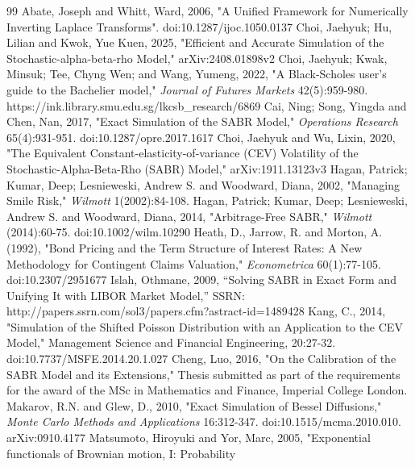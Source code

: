\documentclass[12pt,oneside]{article}
\numberwithin{equation}{section}
\begin{document}
\bigskip
\begin{thebibliography}{99}
        Abate, Joseph and Whitt, Ward, 2006, "A Unified Framework for Numerically Inverting Laplace Transforms".
        doi:10.1287/ijoc.1050.0137
        Choi, Jaehyuk; Hu, Lilian and Kwok, Yue Kuen, 2025, "Efficient and Accurate Simulation of the Stochastic-alpha-beta-rho Model,"
        arXiv:2408.01898v2
        Choi, Jaehyuk; Kwak, Minsuk; Tee, Chyng Wen; and Wang, Yumeng, 2022, "A Black-Scholes user's guide to the
        Bachelier model," {\em Journal of Futures Markets} 42(5):959-980. https://ink.library.smu.edu.sg/lkcsb\_research/6869
        Cai, Ning; Song, Yingda and Chen, Nan, 2017, "Exact Simulation of the SABR Model,"
        {\em Operations Research} 65(4):931-951. doi:10.1287/opre.2017.1617
        Choi, Jaehyuk and Wu, Lixin, 2020, "The Equivalent Constant-elasticity-of-variance (CEV) Volatility
        of the Stochastic-Alpha-Beta-Rho (SABR) Model,"
        arXiv:1911.13123v3
        Hagan, Patrick; Kumar, Deep; Lesnieweski, Andrew S. and Woodward, Diana, 2002,
        "Managing Smile Risk," {\em Wilmott} 1(2002):84-108.
        Hagan, Patrick; Kumar, Deep; Lesnieweski, Andrew S. and Woodward, Diana, 2014,
        "Arbitrage-Free SABR," {\em Wilmott} (2014):60-75. doi:10.1002/wilm.10290
        Heath, D., Jarrow, R. and Morton, A. (1992), "Bond Pricing and the Term Structure of Interest Rates:
        A New Methodology for Contingent Claims Valuation," {\em Econometrica} 60(1):77-105.
        doi:10.2307/2951677
        Islah, Othmane, 2009, “Solving SABR in Exact Form and Unifying It with LIBOR Market Model,”
        SSRN: http://papers.ssrn.com/sol3/papers.cfm?astract-id=1489428
        Kang, C., 2014, "Simulation of the Shifted Poisson Distribution with an Application
        to the CEV Model," {Management Science and Financial Engineering}, 20:27-32.
        doi:10.7737/MSFE.2014.20.1.027
        Cheng, Luo, 2016, "On the Calibration of the SABR Model and its
        Extensions," Thesis submitted as part of the requirements for the award
        of the MSc in Mathematics and Finance, Imperial College London. 
        Makarov, R.N. and Glew, D., 2010, "Exact Simulation of Bessel Diffusions,"
        {\em Monte Carlo Methods and Applications} 16:312-347.
        doi:10.1515/mcma.2010.010. arXiv:0910.4177
        Matsumoto, Hiroyuki and Yor, Marc, 2005, "Exponential functionals of Brownian motion, I: Probability

\end{thebibliography}
\end{document}
